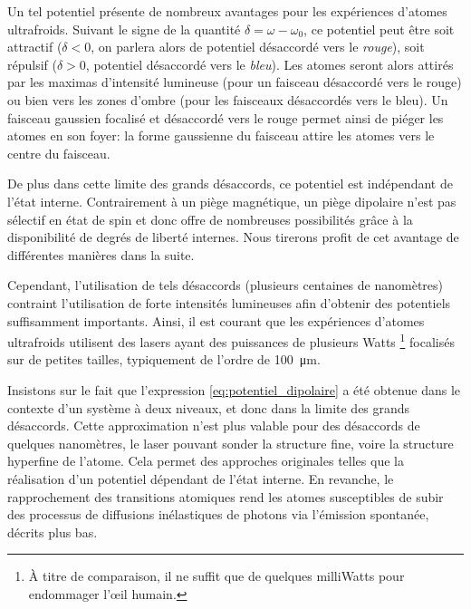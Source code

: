 Un tel potentiel présente de nombreux avantages pour les expériences d'atomes ultrafroids. Suivant le signe de la quantité $\delta = \omega-\omega_0$, ce potentiel peut être soit attractif ($\delta<0$, on parlera alors de potentiel désaccordé vers le \emph{rouge}), soit répulsif ($\delta>0$, potentiel désaccordé vers le \emph{bleu}). Les atomes seront alors attirés par les maximas d'intensité lumineuse (pour un faisceau désaccordé vers le rouge) ou bien vers les zones d'ombre (pour les faisceaux désaccordés vers le bleu). Un faisceau gaussien focalisé et désaccordé vers le rouge permet ainsi de piéger les atomes en son foyer: la forme gaussienne du faisceau attire les atomes vers le centre du faisceau. 

De plus dans cette limite des grands désaccords, ce potentiel est indépendant de l'état interne. Contrairement à un piège magnétique, un piège dipolaire n'est pas sélectif en état de spin et donc offre de nombreuses possibilités grâce à la disponibilité de degrés de liberté internes. Nous tirerons profit de cet avantage de différentes manières dans la suite. 

Cependant, l'utilisation de tels désaccords (plusieurs centaines de nanomètres) contraint l'utilisation de forte intensités lumineuses afin d'obtenir des potentiels suffisamment importants. Ainsi, il est courant que les expériences d'atomes ultrafroids utilisent des lasers ayant des puissances de plusieurs Watts \footnote{À titre de comparaison, il ne suffit que de quelques milliWatts pour endommager l'œil humain.} focalisés sur de petites tailles, typiquement de l'ordre de \SI{100}{\micro\metre}. 

Insistons sur le fait que l'expression \ref{eq:potentiel_dipolaire} a été obtenue dans le contexte d'un système à deux niveaux, et donc dans la limite des grands désaccords. Cette approximation n'est plus valable pour des désaccords de quelques nanomètres, le laser pouvant sonder la structure fine, voire la structure hyperfine de l'atome. Cela permet des approches originales telles que la réalisation d'un potentiel dépendant de l'état interne. En revanche, le rapprochement des transitions atomiques rend les atomes susceptibles de subir des processus de diffusions inélastiques de photons via l'émission spontanée, décrits plus bas.



